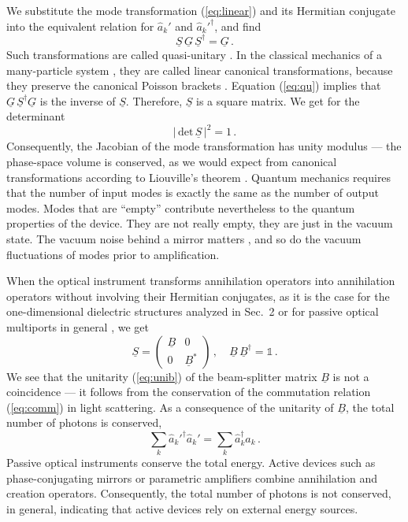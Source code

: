 \documentclass[12pt,amsmath,amssymb]{article}
\numberwithin{equation}{section}
\begin{document}
We substitute the mode transformation (\ref{eq:linear}) and its Hermitian
conjugate into the equivalent relation for $\hat{a}_k'$ and
$\hat{a}_k'^\dagger$, and find
\begin{equation}
\label{eq:qu}
\underline{S}\,\underline{G}\,\underline{S}^\dagger = \underline{G}\,.
\end{equation}
Such transformations are called quasi-unitary \cite{Cornwell}. In the
classical mechanics of a many-particle system \cite{LL1}, they
are called linear canonical transformations, because they
preserve the canonical Poisson brackets \cite{LL1}. Equation
(\ref{eq:qu}) implies that $\underline{G}\,\underline{S}^\dagger
\underline{G}$ is the inverse of $\underline{S}$. Therefore,
$\underline{S}$ is a square matrix. We get for the determinant
\begin{equation}
\label{eq:jacobi} \left|\, \mathrm{det}\, \underline{S}
\,\right|^2 = 1 \,.
\end{equation}
Consequently, the Jacobian of the mode transformation has unity
modulus --- the phase-space volume is conserved, as we would
expect from canonical transformations according to Liouville's
theorem \cite{LL1}. Quantum mechanics requires that the number of
input modes is exactly the same as the number of output modes.
Modes that are ``empty'' contribute nevertheless to the quantum
properties of the device. They are not really empty, they are just in
the vacuum state. The vacuum noise behind a mirror matters
\cite{Leonhardt}, and so do the vacuum fluctuations of modes
prior to amplification.

When the optical instrument transforms annihilation operators into
annihilation operators without involving their Hermitian
conjugates, as it is the case for the one-dimensional dielectric
structures analyzed in Sec.\ 2 or for passive optical multiports in
general \cite{Mattle,Reck,Torma1,Torma3,Walker}, we get
\begin{equation}
\label{eq:unit} \underline{S} = \left(
    \begin{array}{cc}
      \underline{B} & 0 \\
       0 & {\underline{B}^*}
    \end{array}
\right) \,,\quad \underline{B}\,\underline{B}^\dagger =  \mathds{1}
\,.
\end{equation}
We see that the unitarity (\ref{eq:unib}) of the beam-splitter
matrix $\underline{B}$ is not a coincidence
--- it follows from the conservation of the commutation relation
(\ref{eq:comm}) in light scattering. As a consequence of the
unitarity of $\underline{B}$, the total number of photons is
conserved,
\begin{equation}
\label{eq:totalnumber}
\sum_k \hat{a}_k'^\dagger \hat{a}_k' =
\sum_k \hat{a}_k^\dagger \hat{a}_k
\,.
\end{equation}
Passive optical instruments conserve the total energy. Active
devices such as phase-conjugating mirrors \cite{Shen} or parametric
amplifiers \cite{Shen} combine annihilation and creation operators.
Consequently, the total number of photons is not conserved, in
general, indicating that active devices rely on external energy
sources.
\end{document}
